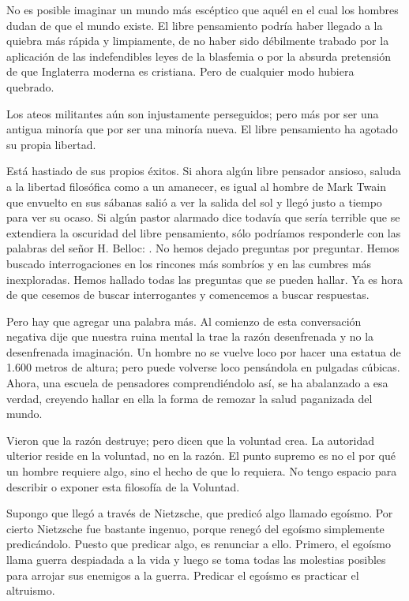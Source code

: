 No es posible imaginar un mundo más escéptico que aquél en el cual los hombres dudan de que el
mundo existe. El libre pensamiento podría haber llegado a la quiebra más rápida y limpiamente, de no
haber sido débilmente trabado por la aplicación de las indefendibles leyes de la blasfemia o por la absurda
pretensión de que Inglaterra moderna es cristiana. Pero de cualquier modo hubiera quebrado.

Los ateos militantes aún son injustamente perseguidos; pero más por ser una antigua minoría que
por ser una minoría nueva. El libre pensamiento ha agotado su propia libertad.

Está hastiado de sus propios éxitos. Si ahora algún libre pensador ansioso, saluda a la libertad
filosófica como a un amanecer, es igual al hombre de Mark Twain que envuelto en sus sábanas salió a ver
la salida del sol y llegó justo a tiempo para ver su ocaso. Si algún pastor alarmado dice todavía que sería
terrible que se extendiera la oscuridad del libre pensamiento, sólo podríamos responderle con las palabras
del señor H. Belloc: . No hemos dejado preguntas por preguntar. Hemos
buscado interrogaciones en los rincones más sombríos y en las cumbres más inexploradas. Hemos hallado
todas las preguntas que se pueden hallar. Ya es hora de que cesemos de buscar interrogantes y
comencemos a buscar respuestas.

Pero hay que agregar una palabra más. Al comienzo de esta conversación negativa dije que nuestra
ruina mental la trae la razón desenfrenada y no la desenfrenada imaginación. Un hombre no se vuelve
loco por hacer una estatua de 1.600 metros de altura; pero puede volverse loco pensándola en pulgadas
cúbicas. Ahora, una escuela de pensadores comprendiéndolo así, se ha abalanzado a esa verdad, creyendo
hallar en ella la forma de remozar la salud paganizada del mundo.

Vieron que la razón destruye; pero dicen que la voluntad crea. La autoridad ulterior reside en la
voluntad, no en la razón. El punto supremo es no el por qué un hombre requiere algo, sino el hecho de
que lo requiera. No tengo espacio para describir o exponer esta filosofía de la Voluntad.

Supongo que llegó a través de Nietzsche, que predicó algo llamado egoísmo. Por cierto Nietzsche
fue bastante ingenuo, porque renegó del egoísmo simplemente predicándolo. Puesto que predicar algo, es
renunciar a ello. Primero, el egoísmo llama guerra despiadada a la vida y luego se toma todas las
molestias posibles para arrojar sus enemigos a la guerra. Predicar el egoísmo es practicar el altruismo.

